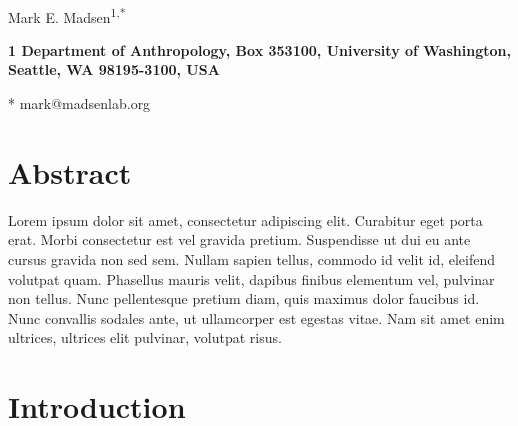 \documentclass[10pt,letterpaper]{article}
\date{}
\begin{document}
\vspace*{0.35in}

\begin{flushleft}
{\Large
\textbf{}
}
\newline
\\
Mark E. Madsen\textsuperscript{1,*}


\bf{1} Department of Anthropology, Box 353100, University of Washington, Seattle, WA 98195-3100, USA
\\
\bigskip

% 



* mark@madsenlab.org

\end{flushleft}
\section*{Abstract}
Lorem ipsum dolor sit amet, consectetur adipiscing elit. Curabitur eget porta erat. Morbi consectetur est vel gravida pretium. Suspendisse ut dui eu ante cursus gravida non sed sem. Nullam sapien tellus, commodo id velit id, eleifend volutpat quam. Phasellus mauris velit, dapibus finibus elementum vel, pulvinar non tellus. Nunc pellentesque pretium diam, quis maximus dolor faucibus id. Nunc convallis sodales ante, ut ullamcorper est egestas vitae. Nam sit amet enim ultrices, ultrices elit pulvinar, volutpat risus.


\linenumbers

\section{Introduction}\label{introduction}
\end{document}
